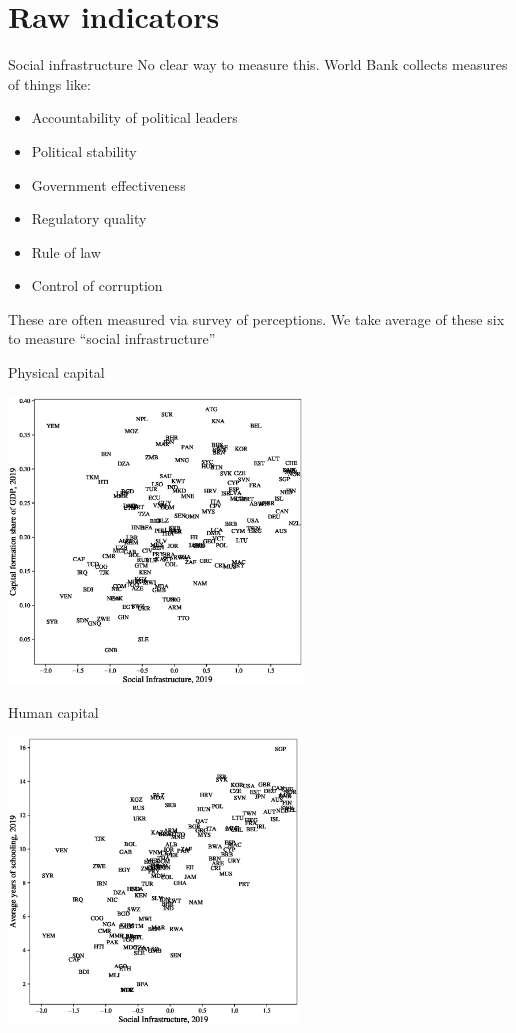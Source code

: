 \section{Raw indicators}
\begin{frame}{Social infrastructure}
No clear way to measure this. World Bank collects measures of things like:
\begin{itemize}
	\item Accountability of political leaders
	\item Political stability
	\item Government effectiveness
	\item Regulatory quality
	\item Rule of law
	\item Control of corruption
\end{itemize}
These are often measured via survey of perceptions. We take average of these six to measure ``social infrastructure''
\end{frame}

\begin{frame}{Physical capital}
\begin{center}
\includegraphics[height=3in]{../Figures/fig-ch8-fig1.eps}
\end{center}
\end{frame}

\begin{frame}{Human capital}
\begin{center}
\includegraphics[height=3in]{../Figures/fig-ch8-fig2.eps}
\end{center}
\end{frame}


